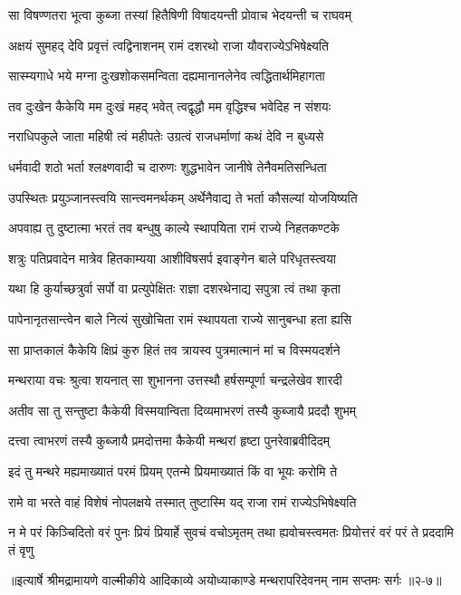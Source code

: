 \twolineshloka
{सा विषण्णतरा भूत्वा कुब्जा तस्यां हितैषिणी}
{विषादयन्ती प्रोवाच भेदयन्ती च राघवम्} %

\twolineshloka
{अक्षयं सुमहद् देवि प्रवृत्तं त्वद्विनाशनम्}
{रामं दशरथो राजा यौवराज्येऽभिषेक्ष्यति} %

\twolineshloka
{सास्म्यगाधे भये मग्ना दुःखशोकसमन्विता}
{दह्यमानानलेनेव त्वद्धितार्थमिहागता} %

\twolineshloka
{तव दुःखेन कैकेयि मम दुःखं महद् भवेत्}
{त्वद्वृद्धौ मम वृद्धिश्च भवेदिह न संशयः} %

\twolineshloka
{नराधिपकुले जाता महिषी त्वं महीपतेः}
{उग्रत्वं राजधर्माणां कथं देवि न बुध्यसे} %

\twolineshloka
{धर्मवादी शठो भर्ता श्लक्ष्णवादी च दारुणः}
{शुद्धभावेन जानीषे तेनैवमतिसन्धिता} %

\twolineshloka
{उपस्थितः प्रयुञ्जानस्त्वयि सान्त्वमनर्थकम्}
{अर्थेनैवाद्य ते भर्ता कौसल्यां योजयिष्यति} %

\twolineshloka
{अपवाह्य तु दुष्टात्मा भरतं तव बन्धुषु}
{काल्ये स्थापयिता रामं राज्ये निहतकण्टके} %

\twolineshloka
{शत्रुः पतिप्रवादेन मात्रेव हितकाम्यया}
{आशीविषसर्प इवाङ्गेन बाले परिधृतस्त्वया} %

\twolineshloka
{यथा हि कुर्याच्छत्रुर्वा सर्पो वा प्रत्युपेक्षितः}
{राज्ञा दशरथेनाद्य सपुत्रा त्वं तथा कृता} %

\twolineshloka
{पापेनानृतसान्त्वेन बाले नित्यं सुखोचिता}
{रामं स्थापयता राज्ये सानुबन्धा हता ह्यसि} %

\twolineshloka
{सा प्राप्तकालं कैकेयि क्षिप्रं कुरु हितं तव}
{त्रायस्व पुत्रमात्मानं मां च विस्मयदर्शने} %

\twolineshloka
{मन्थराया वचः श्रुत्वा शयनात् सा शुभानना}
{उत्तस्थौ हर्षसम्पूर्णा चन्द्रलेखेव शारदी} %

\twolineshloka
{अतीव सा तु सन्तुष्टा कैकेयी विस्मयान्विता}
{दिव्यमाभरणं तस्यै कुब्जायै प्रददौ शुभम्} %

\twolineshloka
{दत्त्वा त्वाभरणं तस्यै कुब्जायै प्रमदोत्तमा}
{कैकेयी मन्थरां हृष्टा पुनरेवाब्रवीदिदम्} %

\twolineshloka
{इदं तु मन्थरे मह्यमाख्यातं परमं प्रियम्}
{एतन्मे प्रियमाख्यातं किं वा भूयः करोमि ते} %

\twolineshloka
{रामे वा भरते वाहं विशेषं नोपलक्षये}
{तस्मात् तुष्टास्मि यद् राजा रामं राज्येऽभिषेक्ष्यति} %

\twolineshloka
{न मे परं किञ्चिदितो वरं पुनः प्रियं प्रियार्हे सुवचं वचोऽमृतम्}
{तथा ह्यवोचस्त्वमतः प्रियोत्तरं वरं परं ते प्रददामि तं वृणु} %


॥इत्यार्षे श्रीमद्रामायणे वाल्मीकीये आदिकाव्ये अयोध्याकाण्डे मन्थरापरिदेवनम् नाम सप्तमः सर्गः ॥२-७॥
